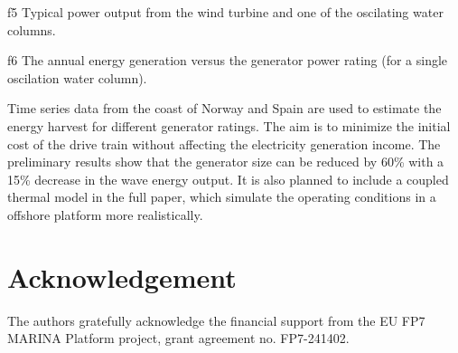 \documentclass[twocolumn]{article}
\begin{document}
{f5} Typical power output from the wind turbine and one of the oscilating water columns.

{f6} The annual energy generation versus the generator power rating (for a single oscilation water column).

Time series data from the coast of Norway and Spain are used to estimate the energy harvest for different generator ratings. The aim is to minimize the initial cost of the drive train without affecting the electricity generation income. The preliminary results show that the generator size can be reduced by 60\% with a 15\% decrease in the wave energy output. It is also planned to include a coupled thermal model in the full paper, which simulate the operating conditions in a offshore platform more realistically.


\section*{Acknowledgement} %
\label{sec:acknowledgement}

The authors gratefully acknowledge the financial support
from the EU FP7 MARINA Platform project, grant agreement no. FP7-241402.






\end{document}
